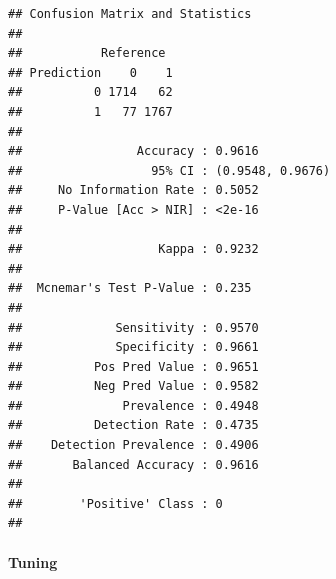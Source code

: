 \documentclass[
]{article}
\newenvironment{Shaded}{\begin{snugshade}}{\end{snugshade}}
\newcommand{\AttributeTok}[1]{\textcolor[rgb]{0.77,0.63,0.00}{#1}}
\newcommand{\DecValTok}[1]{\textcolor[rgb]{0.00,0.00,0.81}{#1}}
\newcommand{\FloatTok}[1]{\textcolor[rgb]{0.00,0.00,0.81}{#1}}
\newcommand{\FunctionTok}[1]{\textcolor[rgb]{0.00,0.00,0.00}{#1}}
\newcommand{\NormalTok}[1]{#1}
\newcommand{\OtherTok}[1]{\textcolor[rgb]{0.56,0.35,0.01}{#1}}
\newcommand{\SpecialCharTok}[1]{\textcolor[rgb]{0.00,0.00,0.00}{#1}}
\newcommand{\StringTok}[1]{\textcolor[rgb]{0.31,0.60,0.02}{#1}}
\begin{document}
\begin{verbatim}
## Confusion Matrix and Statistics
## 
##           Reference
## Prediction    0    1
##          0 1714   62
##          1   77 1767
##                                           
##                Accuracy : 0.9616          
##                  95% CI : (0.9548, 0.9676)
##     No Information Rate : 0.5052          
##     P-Value [Acc > NIR] : <2e-16          
##                                           
##                   Kappa : 0.9232          
##                                           
##  Mcnemar's Test P-Value : 0.235           
##                                           
##             Sensitivity : 0.9570          
##             Specificity : 0.9661          
##          Pos Pred Value : 0.9651          
##          Neg Pred Value : 0.9582          
##              Prevalence : 0.4948          
##          Detection Rate : 0.4735          
##    Detection Prevalence : 0.4906          
##       Balanced Accuracy : 0.9616          
##                                           
##        'Positive' Class : 0               
## 
\end{verbatim}

\hypertarget{tuning}{%
\paragraph{Tuning}\label{tuning}}

\begin{Shaded}
\end{Shaded}
\end{document}
